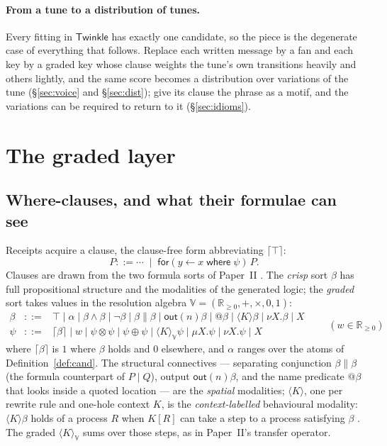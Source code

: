 \documentclass[11pt,a4paper]{article}
\theoremstyle{plain}
\theoremstyle{definition}
\theoremstyle{remark}
\newcommand{\V}{\mathbb{V}}
\newcommand{\Rnn}{\mathbb{R}_{\geq 0}}
\newcommand{\tensorv}{\otimes}
\newcommand{\sumv}{\oplus}
\newcommand{\crisp}[1]{\lceil #1 \rceil}
\newcommand{\rcvw}[4]{\mathsf{for}(#1 \leftarrow #2 \;\mathsf{where}\; #3)\,#4}
\newcommand{\atm}[1]{\mathsf{#1}}
\begin{document}
\paragraph{From a tune to a distribution of tunes.} Every fitting in
$\mathsf{Twinkle}$ has exactly one candidate, so the piece is the degenerate case
of everything that follows. Replace each written message by a fan and each key
by a graded key whose clause weights the tune's own transitions heavily and
others lightly, and the same score becomes a distribution over variations of the
tune (\S\ref{sec:voice} and \S\ref{sec:dist}); give its clause the phrase as a
motif, and the variations can be required to return to it
(\S\ref{sec:idioms}).


\section{The graded layer}\label{sec:graded}

\subsection{Where-clauses, and what their formulae can see}

Receipts acquire a clause, the clause-free form abbreviating $\crisp{\top}$:
\[
P ::= \cdots \;\mid\; \rcvw{y}{x}{\psi}{P} .
\]
Clauses are drawn from the two formula sorts of Paper~II \cite{GWpln}. The
\emph{crisp} sort $\beta$ has full propositional structure and the modalities of
the generated logic; the \emph{graded} sort takes values in the resolution
algebra $\V = (\Rnn, +, \times, 0, 1)$:
\[
\begin{array}{rcl}
\beta &::=& \top \mid \alpha \mid \beta\wedge\beta \mid \neg\beta
  \mid \beta \parallel \beta \mid \atm{out}(n)\beta \mid @\beta
  \mid \langle K\rangle\beta \mid \nu X.\beta \mid X \\[3pt]
\psi &::=& \crisp{\beta} \mid w \mid \psi\tensorv\psi \mid \psi\sumv\psi
  \mid \langle K\rangle_{\V}\psi \mid \mu X.\psi \mid \nu X.\psi \mid X
\end{array}
\qquad (w \in \Rnn)
\]
where $\crisp{\beta}$ is $1$ where $\beta$ holds and $0$ elsewhere, and
$\alpha$ ranges over the atoms of Definition~\ref{def:cand}. The structural
connectives --- separating conjunction $\beta\parallel\beta$ (the formula
counterpart of $P \mid Q$), output
$\atm{out}(n)\beta$, and the name predicate $@\beta$ that looks inside a quoted
location --- are the \emph{spatial} modalities; $\langle K\rangle$, one per
rewrite rule and one-hole context $K$, is the \emph{context-labelled}
behavioural modality: $\langle K\rangle\beta$ holds of a process $R$ when $K[R]$
can take a step to a process satisfying $\beta$ \cite{NSL,CairesCardelli,Omnibus}.
The graded $\langle K\rangle_{\V}$ sums over those steps, as in Paper~II's
transfer operator.
\end{document}
